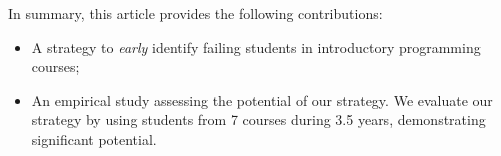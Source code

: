 In summary, this article provides the following contributions:

\begin{itemize}

	\item A strategy to \textit{early} identify failing students in introductory programming courses;
	
	\item An empirical study assessing the potential of our strategy. We evaluate our strategy by using \totalStudents students from 7 courses during 3.5 years, demonstrating significant potential.

\end{itemize}
